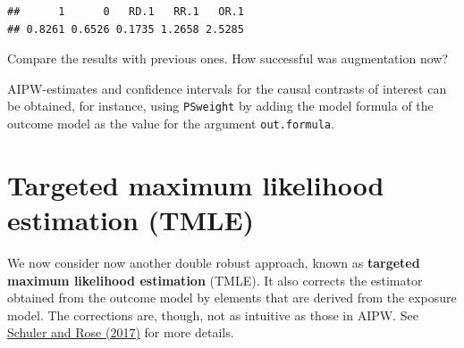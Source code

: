 \documentclass[
]{book}
\newenvironment{Shaded}{\begin{snugshade}}{\end{snugshade}}
\newcommand{\DecValTok}[1]{\textcolor[rgb]{0.00,0.00,0.81}{#1}}
\newcommand{\FunctionTok}[1]{\textcolor[rgb]{0.13,0.29,0.53}{\textbf{#1}}}
\newcommand{\NormalTok}[1]{#1}
\newcommand{\OtherTok}[1]{\textcolor[rgb]{0.56,0.35,0.01}{#1}}
\newcommand{\SpecialCharTok}[1]{\textcolor[rgb]{0.81,0.36,0.00}{\textbf{#1}}}
\begin{document}
\begin{Shaded}
\end{Shaded}

\begin{verbatim}
##      1      0   RD.1   RR.1   OR.1 
## 0.8261 0.6526 0.1735 1.2658 2.5285
\end{verbatim}

Compare the results with previous ones.
How successful was augmentation now?

AIPW-estimates and confidence
intervals for the causal contrasts of interest can
be obtained, for instance, using \texttt{PSweight} by adding
the model formula of the outcome model
as the value for the argument \texttt{out.formula}.

\section{Targeted maximum likelihood estimation (TMLE)}\label{targeted-maximum-likelihood-estimation-tmle}

We now consider now another double robust approach,
known as \textbf{targeted
maximum likelihood estimation} (TMLE).
It also corrects the estimator
obtained from the outcome model by elements that are derived from the exposure model. The corrections are, though, not as
intuitive as those in AIPW. See \href{https://doi.org/10.1093/aje/kww165}{Schuler and Rose
(2017)} for more details.
\end{document}
